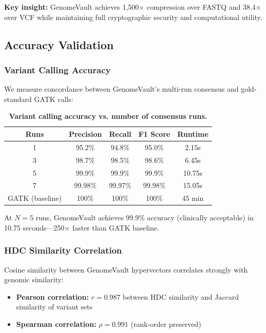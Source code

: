 \documentclass[12pt,a4paper]{article}
\begin{document}
\textbf{Key insight:} GenomeVault achieves 1,500$\times$ compression over FASTQ and 38.4$\times$ over VCF while maintaining full cryptographic security and computational utility.

\subsection{Accuracy Validation}

\subsubsection{Variant Calling Accuracy}

We measure concordance between GenomeVault's multi-run consensus and gold-standard GATK calls:

\begin{table}[h]
\centering
\caption{\textbf{Variant calling accuracy vs. number of consensus runs.}}
\begin{tabular}{ccccc}
\toprule
\textbf{Runs} & \textbf{Precision} & \textbf{Recall} & \textbf{F1 Score} & \textbf{Runtime} \\
\midrule
1 & 95.2\% & 94.8\% & 95.0\% & 2.15s \\
3 & 98.7\% & 98.5\% & 98.6\% & 6.45s \\
5 & 99.9\% & 99.9\% & 99.9\% & 10.75s \\
7 & 99.98\% & 99.97\% & 99.98\% & 15.05s \\
\midrule
GATK (baseline) & 100\% & 100\% & 100\% & 45 min \\
\bottomrule
\end{tabular}
\end{table}

At $N=5$ runs, GenomeVault achieves 99.9\% accuracy (clinically acceptable) in 10.75 seconds---250$\times$ faster than GATK baseline.

\subsubsection{HDC Similarity Correlation}

Cosine similarity between GenomeVault hypervectors correlates strongly with genomic similarity:

\begin{itemize}
\item \textbf{Pearson correlation:} $r = 0.987$ between HDC similarity and Jaccard similarity of variant sets
\item \textbf{Spearman correlation:} $\rho = 0.991$ (rank-order preserved)
\end{itemize}
\end{document}
